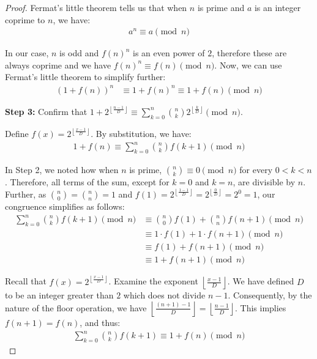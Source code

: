 \documentclass{article}
\theoremstyle{plain}
\theoremstyle{definition}
\begin{document}
\begin{proof}
    Fermat's little theorem tells us that when $n$ is prime and $a$ is an integer coprime to $n$, we have:
    \begin{align}
        a^n \equiv a \pmod{n}
    \end{align}
    
    In our case, $n$ is odd and $f(n)^n$ is an even power of $2$, therefore these are always coprime and we have $f(n)^n \equiv f(n) \pmod{n}$. Now, we can use Fermat's little theorem to simplify further:
    \begin{align}
        (1 + f(n))^n &\equiv 1 + f(n)^n  \equiv 1 + f(n) \pmod{n}
    \end{align}
    
    \textbf{Step 3:} Confirm that $1 + 2^{\left\lfloor \frac{n-1}{D} \right\rfloor} \equiv \sum_{k=0}^{n} \binom{n}{k} 2^{\left\lfloor \frac{k}{D} \right\rfloor} \pmod{n}$. \label{proof:primes:step:3}

    Define $f(x) = 2^{\left\lfloor \frac{x-1}{D} \right\rfloor}$. By substitution, we have:
    \begin{align}
        1 + f(n) \equiv \sum_{k=0}^{n} \binom{n}{k} f(k+1) \pmod{n}
    \end{align}
    
    In Step 2, we noted how when $n$ is prime, $\binom{n}{k} \equiv 0 \pmod{n}$ for every $0 < k < n$. Therefore, all terms of the sum, except for $k = 0$ and $k = n$, are divisible by $n$. Further, as $\binom{n}{0} = \binom{n}{n} = 1$ and $f(1) = 2^{\left\lfloor \frac{1-1}{D} \right\rfloor} = 2^{\left\lfloor \frac{0}{D} \right\rfloor} = 2^{0} = 1$, our congruence simplifies as follows:
    \begin{align}
        \sum_{k=0}^{n} \binom{n}{k} f(k+1) \pmod{n} &\equiv \binom{n}{0} f(1) + \binom{n}{n} f(n+1) \pmod{n} \\
                     &\equiv 1 \cdot f(1) + 1 \cdot f(n+1) \pmod{n} \\
                     &\equiv f(1) + f(n+1) \pmod{n} \\
                     &\equiv 1 + f(n+1) \pmod{n}
    \end{align}
    
    Recall that $f(x) = 2^{\left\lfloor \frac{x-1}{D} \right\rfloor}$. Examine the exponent $\left\lfloor \frac{x-1}{D} \right\rfloor$. We have defined $D$ to be an integer greater than $2$ which does not divide $n-1$. Consequently, by the nature of the floor operation, we have $\left\lfloor \frac{(n+1)-1}{D} \right\rfloor = \left\lfloor \frac{n-1}{D} \right\rfloor$. This implies $f(n+1) = f(n)$, and thus:
    \begin{align}
        \sum_{k=0}^{n} \binom{n}{k} f(k+1) \equiv 1 + f(n) \pmod{n}
    \end{align}
    

\end{proof}
\end{document}
